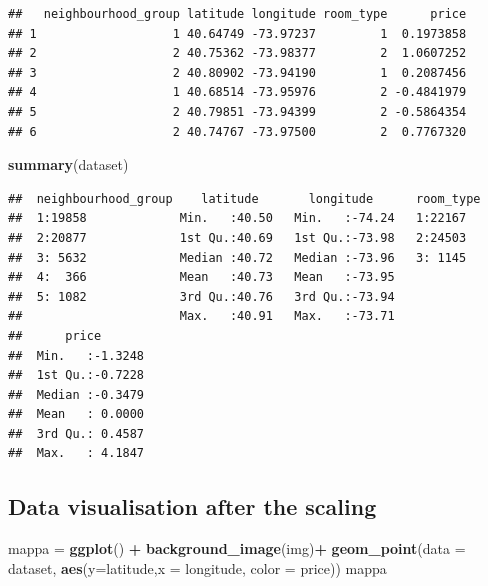 \documentclass[
]{article}
\newenvironment{Shaded}{\begin{snugshade}}{\end{snugshade}}
\newcommand{\DataTypeTok}[1]{\textcolor[rgb]{0.13,0.29,0.53}{#1}}
\newcommand{\KeywordTok}[1]{\textcolor[rgb]{0.13,0.29,0.53}{\textbf{#1}}}
\newcommand{\NormalTok}[1]{#1}
\newcommand{\OperatorTok}[1]{\textcolor[rgb]{0.81,0.36,0.00}{\textbf{#1}}}
\newcommand{\StringTok}[1]{\textcolor[rgb]{0.31,0.60,0.02}{#1}}
\begin{document}
\begin{verbatim}
##   neighbourhood_group latitude longitude room_type      price
## 1                   1 40.64749 -73.97237         1  0.1973858
## 2                   2 40.75362 -73.98377         2  1.0607252
## 3                   2 40.80902 -73.94190         1  0.2087456
## 4                   1 40.68514 -73.95976         2 -0.4841979
## 5                   2 40.79851 -73.94399         2 -0.5864354
## 6                   2 40.74767 -73.97500         2  0.7767320
\end{verbatim}

\begin{Shaded}
\begin{Highlighting}[]
\KeywordTok{summary}\NormalTok{(dataset)}
\end{Highlighting}
\end{Shaded}

\begin{verbatim}
##  neighbourhood_group    latitude       longitude      room_type
##  1:19858             Min.   :40.50   Min.   :-74.24   1:22167  
##  2:20877             1st Qu.:40.69   1st Qu.:-73.98   2:24503  
##  3: 5632             Median :40.72   Median :-73.96   3: 1145  
##  4:  366             Mean   :40.73   Mean   :-73.95            
##  5: 1082             3rd Qu.:40.76   3rd Qu.:-73.94            
##                      Max.   :40.91   Max.   :-73.71            
##      price        
##  Min.   :-1.3248  
##  1st Qu.:-0.7228  
##  Median :-0.3479  
##  Mean   : 0.0000  
##  3rd Qu.: 0.4587  
##  Max.   : 4.1847
\end{verbatim}

\hypertarget{data-visualisation-after-the-scaling}{%
\subsection{Data visualisation after the
scaling}\label{data-visualisation-after-the-scaling}}

\begin{Shaded}
\begin{Highlighting}[]
\NormalTok{mappa =}\StringTok{ }\KeywordTok{ggplot}\NormalTok{() }\OperatorTok{+}\StringTok{ }\KeywordTok{background_image}\NormalTok{(img)}\OperatorTok{+}\StringTok{ }\KeywordTok{geom_point}\NormalTok{(}\DataTypeTok{data =}\NormalTok{ dataset,  }\KeywordTok{aes}\NormalTok{(}\DataTypeTok{y=}\NormalTok{latitude,}\DataTypeTok{x =}\NormalTok{ longitude, }\DataTypeTok{color =}\NormalTok{ price)) }
\NormalTok{mappa}
\end{Highlighting}
\end{Shaded}
\end{document}
